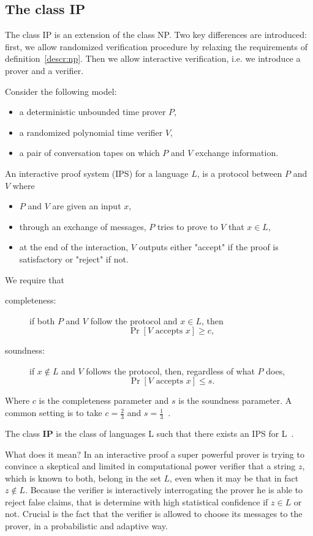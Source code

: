 \subsection{The class IP}
The class IP is an extension of the class NP. Two key differences are introduced: first, we allow randomized verification procedure by relaxing the requirements of definition~\ref{descr:np}. Then we allow interactive verification, i.e. we introduce a prover and a verifier.
\begin{defn}
    Consider the following model:
    \begin{itemize}
        \item a deterministic unbounded time prover $P$,
        \item a randomized polynomial time verifier $V$,
        \item a pair of conversation tapes on which $P$ and $V$ exchange information.
    \end{itemize}
    An interactive proof system (IPS) for a language $L$, is a protocol between $P$ and $V$ where
    \begin{itemize}
        \item $P$ and $V$ are given an input $x$,
        \item through an exchange of messages, $P$ tries to prove to $V$ that $x \in L$,
        \item at the end of the interaction, $V$ outputs either "accept" if the proof is satisfactory or "reject" if not.
    \end{itemize}
    We require that
    \begin{description}
\item[completeness:] if both $P$ and $V$ follow the protocol and $x \in L$, then
$$
\operatorname{Pr}[V \text { accepts } x] \geq c,
$$
\item[soundness:] if $x \notin L$ and $V$ follows the protocol, then, regardless of what $P$ does,
$$
\operatorname{Pr}[V \text { accepts } x] \leq s.
$$
    \end{description}
    Where $c$ is the completeness parameter and $s$ is the soundness parameter. A common setting is to take $c=\frac{2}{3}$ and $s=\frac{1}{3}$~\cite{randomness}.
\end{defn}

\begin{defn}
    The class \textbf{IP} is the class of languages L such that there exists an IPS for L~\cite{randomness}.
\end{defn}
What does it mean? In an interactive proof a super powerful prover is trying to convince a skeptical and limited in computational power verifier that a string $z$, which is known to both, belong in the set $L$, even when it may be that in fact $z \notin L$. Because the verifier is interactively interrogating the prover he is able to reject false claims, that is determine with high statistical confidence if $z \in L$ or not. Crucial is the fact that the verifier is allowed to choose its messages to the prover, in a probabilistic and adaptive way.



